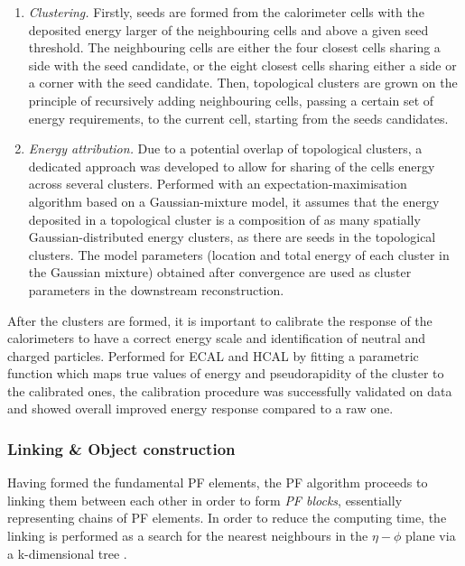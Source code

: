 \begin{enumerate}
    \item \textit{Clustering.} Firstly, seeds are formed from the calorimeter cells with the deposited energy larger of the neighbouring cells and above a given seed threshold. The neighbouring cells are either the four closest cells sharing a side with the seed candidate, or the eight closest cells sharing either a side or a corner with the seed candidate. Then, topological clusters are grown on the principle of recursively adding neighbouring cells, passing a certain set of energy requirements, to the current cell, starting from the seeds candidates.
    \item \textit{Energy attribution.} Due to a potential overlap of topological clusters, a dedicated approach was developed to allow for sharing of the cells energy across several clusters. Performed with an expectation-maximisation algorithm based on a Gaussian-mixture model, it assumes that the energy deposited in a topological cluster is a composition of as many spatially Gaussian-distributed energy clusters, as there are seeds in the topological clusters. The model parameters (location and total energy of each cluster in the Gaussian mixture) obtained after convergence are used as cluster parameters in the downstream reconstruction. 
\end{enumerate}

After the clusters are formed, it is important to calibrate the response of the calorimeters to have a correct energy scale and identification of neutral and charged particles. Performed for ECAL \cite{CMS:2013lxn} and HCAL \cite{CMS:2019hpr} by fitting a parametric function which maps true values of energy and pseudorapidity of the cluster to the calibrated ones, the calibration procedure was successfully validated on data and showed overall improved energy response compared to a raw one.

\subsubsection{Linking \& Object construction}
Having formed the fundamental PF elements, the PF algorithm proceeds to linking them between each other in order to form \textit{PF blocks}, essentially representing chains of PF elements. In order to reduce the computing time, the linking is performed as a search for the nearest neighbours in the $\eta-\phi$ plane via a k-dimensional tree \cite{10.1145/361002.361007}.

